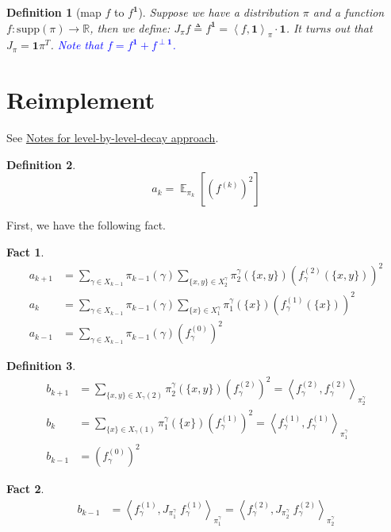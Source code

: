 \documentclass{article}
\newtheorem{define}{Definition}[section]
\newtheorem{fact}{Fact}[section]
\DeclareMathOperator*{\E}{\mathbb{E}}
\def\<{\left\langle}
\def\>{\right\rangle}
\begin{document}
\begin{define}[map $f$ to $f^{\mathbf{1}}$]
  Suppose we have a distribution $\pi$ and a function $f: \mathrm{supp}(\pi) \to \mathbb{R}$, then we define:
  $J_\pi f \triangleq f^{\mathbf{1}} = \<f, \mathbf{1}\>_\pi \cdot \mathbf{1}$. It turns out that $J_\pi = \mathbf{1}\pi^T$. \textcolor{blue}{Note that $f = f^{\mathbf{1}} + f^{\perp \mathbf{1}}$.}
\end{define}

\section{Reimplement \cite{alev2020improved}}

See \href{run:../rapid-mixing-on-matroid-basis/note.pdf}{Notes for level-by-level-decay approach}.

\begin{define}
  \[a_k = \E_{\pi_k} \left[\left(f^{(k)}\right)^2\right]\]
\end{define}

First, we have the following fact.
\begin{fact}
  \begin{align*}
    a_{k+1} &= \sum_{\gamma\in X_{k-1}}\pi_{k-1}(\gamma)\sum_{\{x,y\}\in X^\gamma_2} \pi^\gamma_2(\{x,y\}) \left(f^{(2)}_\gamma(\{x,y\})\right)^2 \\
    a_{k} &= \sum_{\gamma\in X_{k-1}}\pi_{k-1}(\gamma)\sum_{\{x\}\in X^\gamma_1} \pi^\gamma_1(\{x\}) \left(f^{(1)}_\gamma(\{x\})\right)^2 \\
    a_{k-1} &= \sum_{\gamma\in X_{k-1}}\pi_{k-1}(\gamma) \left(f^{(0)}_\gamma\right)^2
  \end{align*}
\end{fact}

\begin{define}
  \begin{align*}
    b_{k+1} &= \sum_{\{x,y\}\in X_\gamma(2)} \pi_2^\gamma (\{x,y\}) (f^{(2)}_\gamma)^2 = \<f^{(2)}_\gamma, f^{(2)}_\gamma\>_{\pi_2^\gamma}\\
    b_k &= \sum_{\{x\}\in X_\gamma(1)} \pi_1^\gamma (\{x\}) (f^{(1)}_\gamma)^2 = \<f^{(1)}_\gamma, f^{(1)}_\gamma\>_{\pi_1^\gamma} \\
    b_{k-1} &= (f^{(0)}_\gamma)^2
  \end{align*}
\end{define}

\begin{fact}
  \begin{align*}
    b_{k-1}
    &= \<f^{(1)}_\gamma, J_{\pi_1^\gamma}\; f^{(1)}_\gamma\>_{\pi_1^\gamma}
     = \<f^{(2)}_\gamma, J_{\pi_2^\gamma}\; f^{(2)}_\gamma\>_{\pi_2^\gamma}
  \end{align*}
\end{fact}
\end{document}
